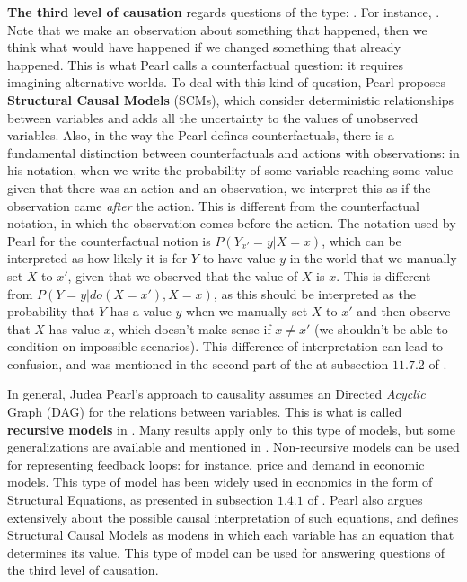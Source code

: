 \textbf{The third level of causation} regards questions of the type: . For instance, . Note that we make an observation about something that happened, then we think what would have happened if we changed something that already happened. This is what Pearl calls a counterfactual question: it requires imagining alternative worlds. To deal with this kind of question, Pearl proposes \textbf{Structural Causal Models} (SCMs), which consider deterministic relationships between variables and adds all the uncertainty to the values of unobserved variables. Also, in the way the Pearl defines counterfactuals, there is a fundamental distinction between counterfactuals and actions with observations: in his notation, when we write the probability of some variable reaching some value given that there was an action and an observation, we interpret this as if the observation came \emph{after} the action. This is different from the counterfactual notation, in which the observation comes before the action. The notation used by Pearl for the counterfactual notion is $P(Y_{x'} = y| X=x)$, which can be interpreted as how likely it is for $Y$ to have value $y$ in the world that we manually set $X$ to $x'$, given that we observed that the value of $X$ is $x$. This is different from $P(Y=y|do(X=x'),X=x)$, as this should be interpreted as the probability that $Y$ has a value $y$ when we manually set $X$ to $x'$ and then observe that $X$ has value $x$, which doesn't make sense if $x \neq x'$ (we shouldn't be able to condition on impossible scenarios). This difference of interpretation can lead to confusion, and was mentioned in the second part of the  at subsection $11.7.2$ of \cite{Causality}.

In general, Judea Pearl's approach to causality assumes an Directed \emph{Acyclic} Graph (DAG) for the relations between variables. This is what is called \textbf{recursive models} in \cite{Causality}. Many results apply only to this type of models, but some generalizations are available and mentioned in \cite{Causality}. Non-recursive models can be used for representing feedback loops: for instance, price and demand in economic models. This type of model has been widely used in economics in the form of Structural Equations, as presented in subsection $1.4.1$ of \cite{Causality}. Pearl also argues extensively about the possible causal interpretation of such equations, and defines Structural Causal Models as modens in which each variable has an equation that determines its value. This type of model can be used for answering questions of the third level of causation.

